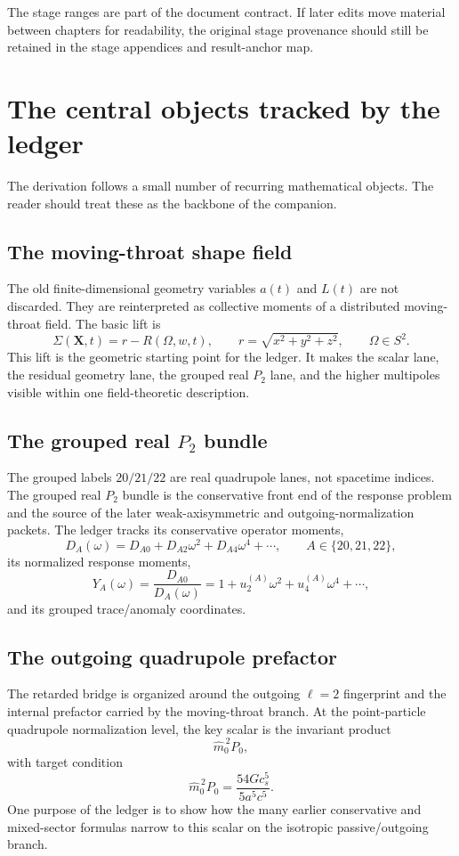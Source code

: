 The stage ranges are part of the document contract.  If later edits move material between chapters for readability, the original stage provenance should still be retained in the stage appendices and result-anchor map.

\section{The central objects tracked by the ledger}

The derivation follows a small number of recurring mathematical objects.  The reader should treat these as the backbone of the companion.

\subsection{The moving-throat shape field}

The old finite-dimensional geometry variables \(a(t)\) and \(L(t)\) are not discarded.  They are reinterpreted as collective moments of a distributed moving-throat field.  The basic lift is
\[
\Sigma(\mathbf X,t)=r-R(\Omega,w,t),
\qquad
r=\sqrt{x^2+y^2+z^2},
\qquad
\Omega\in S^2.
\]
This lift is the geometric starting point for the ledger.  It makes the scalar lane, the residual geometry lane, the grouped real \(P_2\) lane, and the higher multipoles visible within one field-theoretic description.

\subsection{The grouped real \texorpdfstring{\(P_2\)}{P2} bundle}

The grouped labels \(20/21/22\) are real quadrupole lanes, not spacetime indices.  The grouped real \(P_2\) bundle is the conservative front end of the response problem and the source of the later weak-axisymmetric and outgoing-normalization packets.  The ledger tracks its conservative operator moments,
\[
D_A(\omega)=D_{A0}+D_{A2}\omega^2+D_{A4}\omega^4+\cdots,
\qquad A\in\{20,21,22\},
\]
its normalized response moments,
\[
Y_A(\omega)=\frac{D_{A0}}{D_A(\omega)}
=1+u_2^{(A)}\omega^2+u_4^{(A)}\omega^4+\cdots,
\]
and its grouped trace/anomaly coordinates.

\subsection{The outgoing quadrupole prefactor}

The retarded bridge is organized around the outgoing \(\ell=2\) fingerprint and the internal prefactor carried by the moving-throat branch.  At the point-particle quadrupole normalization level, the key scalar is the invariant product
\[
\widehat m_0^{\,2}P_0,
\]
with target condition
\[
\widehat m_0^{\,2}P_0
=
\frac{54G c_s^5}{5a^5c^5}.
\]
One purpose of the ledger is to show how the many earlier conservative and mixed-sector formulas narrow to this scalar on the isotropic passive/outgoing branch.

